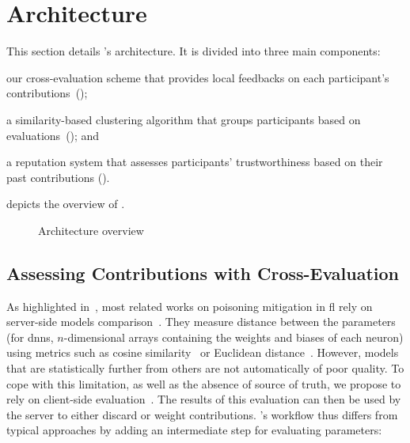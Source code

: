 \section{\label{sec:archi}Architecture}

This section details \thecontrib's architecture.
It is divided into three main components:
\begin{enumerate*}[label=(\emph{\roman*})]
    \item our cross-evaluation scheme that provides local feedbacks on each participant's contributions~();
    \item a similarity-based clustering algorithm that groups participants based on evaluations~(); and 
    \item a reputation system that assesses participants' trustworthiness based on their past contributions ().
\end{enumerate*}
 depicts the overview of \thecontrib.


\begin{figure}
    \centering
    \scalebox{0.7}{
    
    }
    \caption{\label{fig:archi}{Architecture overview}}
\end{figure}


\subsection{Assessing Contributions with Cross-Evaluation}
\label{sec:archi.xeval}

As highlighted in~, most related works on poisoning mitigation in \gls{fl} rely on server-side models comparison~\cite{fung_limitations_2020,awan_contra_2021}. 
They measure distance between the parameters (for \glspl{dnn}, $n$-dimensional arrays containing the weights and biases of each neuron) using metrics such as cosine similarity~\cite{fung_limitations_2020} or Euclidean distance~\cite{ma_shieldfl_2022}.
However, models that are statistically further from others are not automatically of poor quality.
To cope with this limitation, as well as the absence of source of truth, we propose to rely on client-side evaluation~\cite{zhao_shielding_2020}.
The results of this evaluation can then be used by the server to either discard or weight contributions.
\thecontrib's workflow thus differs from typical approaches by adding an intermediate step for evaluating parameters:

